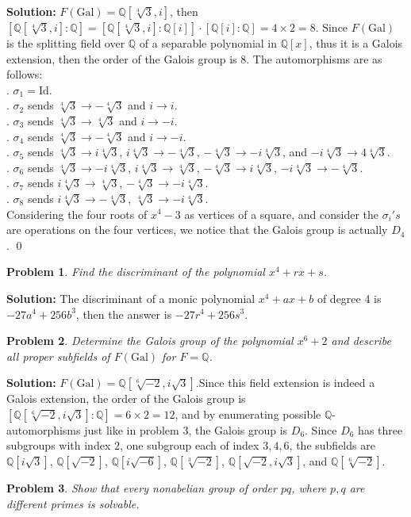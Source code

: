 \documentclass[12pt]{article}
\newtheorem{problem}{Problem}
\begin{document}
\textbf{Solution:} $F(\text{Gal}) = \mathbb{Q}[\sqrt[4]3, i]$, then $[\mathbb{Q}[\sqrt[4]3,i]: \mathbb{Q}]=[\mathbb{Q}[\sqrt[4]3,i]:\mathbb{Q}[i]]\cdot[\mathbb{Q}[i]:\mathbb{Q}]=4\times2=8$. Since $F(\text{Gal})$ is the splitting field over $\mathbb{Q}$ of a separable polynomial in $\mathbb{Q}[x]$, thus it is a Galois extension, then the order of the Galois group is $8$. The automorphisms are as follows: \\
. $\sigma_{1}=\text{Id}$. \\
. $\sigma_{2}$ sends $\sqrt[4]{3}\to-\sqrt[4]{3}$ and $i\to i$. \\
. $\sigma_{3}$ sends $\sqrt[4]{3}\to\sqrt[4]{3}$ and $i\to -i$. \\
. $\sigma_{4}$ sends $\sqrt[4]{3}\to -\sqrt[4]{3}$ and $i\to -i$. \\
. $\sigma_{5}$ sends $\sqrt[4]{3}\to i\sqrt[4]{3}$, $i\sqrt[4]{3}\to-\sqrt[4]{3}$, $-\sqrt[4]{3}\to-i\sqrt[4]{3}$, and $-i\sqrt[4]{3}\to4\sqrt[4]{3}$. \\
. $\sigma_{6}$ sends $\sqrt[4]{3}\to-i\sqrt[4]{3}$, $i\sqrt[4]{3}\to\sqrt[4]{3}$, $-\sqrt[4]{3}\to i\sqrt[4]{3}$, $-i\sqrt[4]{3}\to-\sqrt[4]{3}$.\\
. $\sigma_{7}$ sends $i\sqrt[4]{3}\to\sqrt[4]{3}$, $-\sqrt[4]{3}\to-i\sqrt[4]{3}$.\\
. $\sigma_{8}$ sends $i\sqrt[4]{3}\to-\sqrt[4]{3}$, $\sqrt[4]{3}\to-i\sqrt[4]{3}$.\\
Considering the four roots of $x^4-3$ as vertices of a square, and consider the $\sigma_{i}'s$ are operations on the four vertices, we notice that the Galois group is actually $D_{4}$. \qed
\\
\begin{problem}
Find the discriminant of the polynomial $x^4+rx+s$.
\end{problem} 

\textbf{Solution:} The discriminant of a monic polynomial $x^4+ax+b$ of degree 4 is $-27a^4+256b^3$, then the answer is $-27r^4+256s^3$.
\\
\begin{problem}
Determine the Galois group of the polynomial $x^6+2$ and describe all proper subfields of $F(\text{Gal})$ for $F=\mathbb{Q}$.
\end{problem}

\textbf{Solution:} $F(\text{Gal})=\mathbb{Q}[\sqrt[6]{-2}, i\sqrt{3}]. $Since this field extension is indeed a Galois extension, the order of the Galois group is $[\mathbb{Q}[\sqrt[6]{-2}, i\sqrt{3}]:\mathbb{Q}]=6\times 2=12$, and by enumerating possible $\mathbb{Q}$-automorphisms just like in problem 3, the Galois group is $D_{6}$. Since $D_{6}$ has three subgroups with index $2$, one subgroup each of index $3, 4, 6$, the subfields are $\mathbb{Q}[i\sqrt{3}]$, $\mathbb{Q}[\sqrt{-2}]$, $\mathbb{Q}[i\sqrt {-6}]$, $\mathbb{Q}[\sqrt[3]{-2}]$, $\mathbb{Q}[\sqrt{-2}, i\sqrt{3}]$, and $\mathbb{Q}[\sqrt[6]{-2}]$.
\\
\begin{problem}
Show that every nonabelian group of order $pq$, where $p,q$ are different primes is solvable.
\end{problem}
\end{document}
